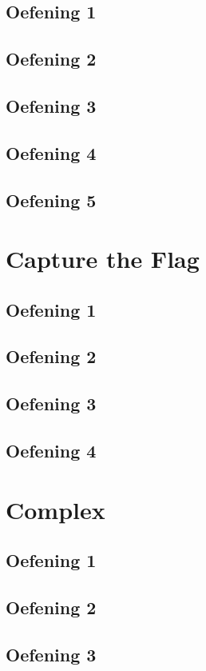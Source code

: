 \documentclass[a4paper,11pt]{report}
\begin{document}
\section{Oefening 1}

\section{Oefening 2}

\section{Oefening 3}

\section{Oefening 4}

\section{Oefening 5}

\newpage

\chapter{Capture the Flag}
\section{Oefening 1}

\section{Oefening 2}

\section{Oefening 3}

\section{Oefening 4}

\newpage

\chapter{Complex}
\section{Oefening 1}

\section{Oefening 2}

\section{Oefening 3}

\newpage
\end{document}
